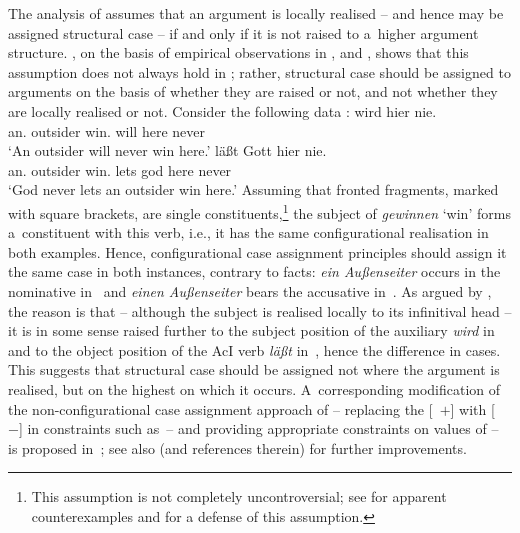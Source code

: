 \documentclass[output=paper
 	        ,biblatex
                ,babelshorthands
                ,newtxmath
                ,draftmode
                ,colorlinks, citecolor=brown
]{langscibook}
\begin{document}
The analysis of \citet{prze:96,Prze99b,Prze99} assumes that an argument is locally realised – and hence may be assigned structural case – if and only if it is not raised to a~higher argument structure.  \citet{Meurers99c,Meurers99b}, on the basis of empirical observations in \citet{Haider90a}, \citet{Grewendorf94a} and \citet{Mueller97c-Eng}, shows that this assumption does not always hold in ; rather, structural case should be assigned to arguments on the basis of whether they are raised or not, and not whether they are locally realised or not.  Consider the following data \citep[294]{Meurers99c}:
\eal
\ex\label{win:ss}
 wird hier nie. \\
    \phtm{[}an.\NOM{} outsider win.\INF{} will here never\\
\glt `An outsider will never win here.'
\ex\label{win:so}
 läßt Gott hier nie. \\
    \phtm{[}an.\ACC{} outsider win.\INF{} lets god here never\\
\glt `God never lets an outsider win here.'
\zl
Assuming that fronted fragments, marked with square brackets, are single constituents,\footnote{This assumption is not completely uncontroversial; see \citet[100–101]{Kiss94} for apparent counterexamples and 
\textcites{Mueller2003b}{Mueller2005d}{MuellerGS}
for a defense of this assumption.} the subject of \emph{gewinnen} `win’ forms a~constituent with this verb, i.e., it has the same configurational realisation in both examples.  Hence, configurational case assignment principles should assign it the same case in both instances, contrary to facts: \emph{ein Au\ss{}enseiter} occurs in the nominative in~ and \emph{einen Au\ss{}enseiter} bears the accusative in~.  As argued by \citet{Meurers99c,Meurers99b}, the reason is that – although the subject is realised locally to its infinitival head – it is in some sense raised further to the subject position of the auxiliary \emph{wird} in~ and to the object position of the AcI verb \emph{l\"a\ss{}t} in~, hence the difference in cases.  This suggests that structural case should be assigned not where the argument is realised, but on the highest  on which it occurs.  A~corresponding modification of the non-configurational case assignment approach of \citet{prze:96,Prze99b,Prze99} – replacing the [~$+$] with [~$-$] in constraints such as~– and providing appropriate constraints on values of  – is proposed in~\citet[93–95]{Prze99b}; see also \citet[Section~17.4]{MuellerLehrbuch3} (and references therein) for further improvements.
\end{document}

